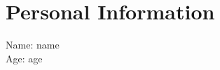 \documentclass{article}
\begin{document}
    \section{Personal Information}
    Name: {{ name }} \\
    Age: {{ age }}
\end{document}
